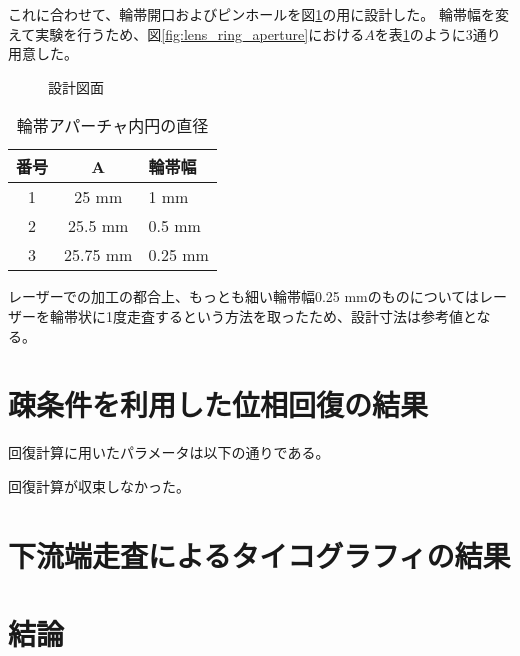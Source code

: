 これに合わせて、輪帯開口およびピンホールを図\ref{fig:lens_pinhole_ring_aperture}の用に設計した。
輪帯幅を変えて実験を行うため、図\ref{fig:lens_ring_aperture}における$A$を表\ref{tb:lens_ring_aperture_inner_diameter}のように3通り用意した。

\begin{figure}[!ht]
\centering

\caption[]{設計図面}
\label{fig:lens_pinhole_ring_aperture}
\end{figure}

\begin{table}[h]
\begin{center}
  \begin{tabular}{|c|c|l|} \hline
    番号 & A & 輪帯幅 \\ \hline
    1 & 25 mm & 1 mm \\
    2 & 25.5 mm & 0.5 mm \\
    3 & 25.75 mm & 0.25 mm \\ \hline
  \end{tabular}
  \caption{輪帯アパーチャ内円の直径}
  \label{tb:lens_ring_aperture_inner_diameter}
\end{center}
\end{table}

レーザーでの加工の都合上、もっとも細い輪帯幅0.25 mmのものについてはレーザーを輪帯状に1度走査するという方法を取ったため、設計寸法は参考値となる。

\clearpage
\newpage


\section{疎条件を利用した位相回復の結果}
回復計算に用いたパラメータは以下の通りである。

回復計算が収束しなかった。


\clearpage
\newpage

\section{下流端走査によるタイコグラフィの結果}


\clearpage
\newpage

\section{結論}
\label{chap4_conclusion}


